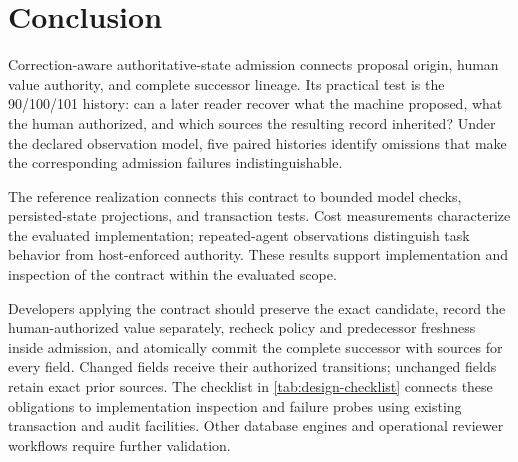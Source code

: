 \section{Conclusion}
\label{sec:conclusion}

Correction-aware authoritative-state admission connects proposal origin, human value authority, and complete successor lineage. Its practical test is the 90/100/101 history: can a later reader recover what the machine proposed, what the human authorized, and which sources the resulting record inherited? Under the declared observation model, five paired histories identify omissions that make the corresponding admission failures indistinguishable.

The reference realization connects this contract to bounded model checks, persisted-state projections, and transaction tests. Cost measurements characterize the evaluated implementation; repeated-agent observations distinguish task behavior from host-enforced authority. These results support implementation and inspection of the contract within the evaluated scope.

Developers applying the contract should preserve the exact candidate, record the human-authorized value separately, recheck policy and predecessor freshness inside admission, and atomically commit the complete successor with sources for every field. Changed fields receive their authorized transitions; unchanged fields retain exact prior sources. The checklist in \cref{tab:design-checklist} connects these obligations to implementation inspection and failure probes using existing transaction and audit facilities. Other database engines and operational reviewer workflows require further validation.
